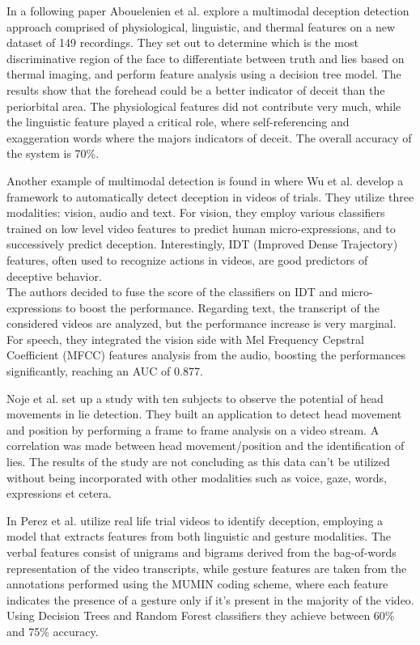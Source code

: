 In a following paper \cite{7782429} Abouelenien et al. explore a multimodal deception detection approach comprised of physiological, linguistic, and thermal features on a new dataset of 149 recordings. They set out to determine which is the most discriminative region of the face to differentiate between truth and lies based on thermal imaging, and perform feature analysis using a decision tree model. The results show that the forehead could be a better indicator of deceit than the periorbital area. The physiological features did not contribute very much, while the linguistic feature played a critical role, where self-referencing and exaggeration words where the majors indicators of deceit. The overall accuracy of the system is 70\%.

Another example of multimodal detection is found in \cite{DBLP:journals/corr/abs-1712-04415} where Wu et al. develop a framework to automatically detect deception in videos of trials. They utilize three modalities: vision, audio and text. For vision, they employ various classifiers trained on low level video features to predict human micro-expressions, and to successively predict deception. Interestingly, IDT (Improved Dense Trajectory) features, often used to recognize actions in videos, are good predictors of deceptive behavior. \\
The authors decided to fuse the score of the classifiers on IDT and micro-expressions to boost the performance. Regarding text, the transcript of the considered videos are analyzed, but the performance increase is very marginal. \\
For speech, they integrated the vision side with Mel Frequency Cepstral Coefficient (MFCC) features analysis from the audio, boosting the performances significantly, reaching an AUC of 0.877. 

Noje et al. \cite{7367432} set up a study with ten subjects to observe the potential of head movements in lie detection. They built an application to detect head movement and position by performing a frame to frame analysis on a video stream. A correlation was made between head movement/position and the identification of lies. The results of the study are not concluding as this data can't be utilized without being incorporated with other modalities such as voice, gaze, words, expressions et cetera.

In \cite{Perez-Rosas:2015:DDU:2818346.2820758} Perez et al. utilize real life trial videos to identify deception, employing a model that extracts features from both linguistic and gesture modalities. The verbal features consist of unigrams and bigrams derived from the bag-of-words representation of the video transcripts, while gesture features are taken from the annotations performed using the MUMIN coding scheme, where each feature indicates the presence of a gesture only if it's present in the majority of the video. Using Decision Trees and Random Forest classifiers they achieve between 60\% and 75\% accuracy.

